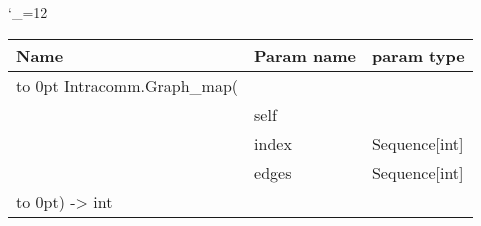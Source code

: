 \begingroup \catcode`\_=12 \tt
\begin{tabular}{lll}
\toprule
\textrm{Name}&\textrm{Param name}&\textrm{param type}\\
\midrule
\hbox to 0pt {Intracomm.Graph_map(\hss}\\
& self\\
& index & Sequence[int]\\
& edges & Sequence[int]\\
\hbox to 0pt{) -> int\hss}\\
\bottomrule
\end{tabular}
\endgroup
